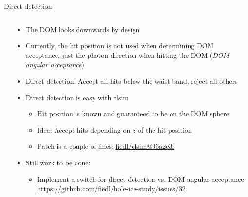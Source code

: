 
\begin{frame}[fragile]{Direct detection}

  \begin{columns}
    \begin{column}{0.5\textwidth}


    \end{column}
    \begin{column}{0.5\textwidth}

      \begin{itemize}
        \item The DOM looks downwards by design
        \item Currently, the hit position is not used when determining DOM acceptance, just the photon direction when hitting the DOM (\textit{DOM angular acceptance})
        \item Direct detection: Accept all hits below the waist band, reject all others
        \item Direct detection is easy with clsim
          \begin{itemize}
            \item Hit position is known and guaranteed to be on the DOM sphere
            \item Idea: Accept hits depending on $z$ of the hit position
            \item Patch is a couple of lines: \href{https://github.com/fiedl/clsim/commit/96a2e3fa1f9bb283b1b98f351e1a131b376a72b8}{fiedl/clsim@96a2e3f}
          \end{itemize}
        \item Still work to be done:
          \begin{itemize}
            \item Implement a switch for direct detection vs. DOM angular acceptance
                \tiny \url{https://github.com/fiedl/hole-ice-study/issues/32} \small
          \end{itemize}
      \end{itemize}


    \end{column}
  \end{columns}

\end{frame}
